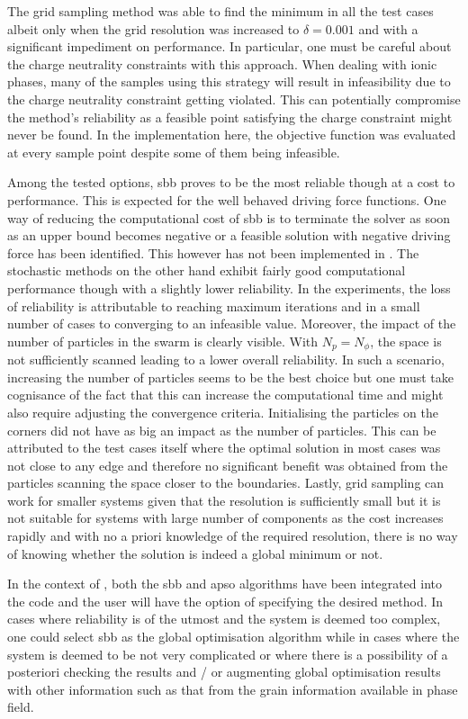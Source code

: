 The grid sampling method was able to find the minimum in all the test cases albeit only when the grid resolution was increased to $\delta = 0.001$ and with a significant impediment on performance. In particular, one must be careful about the charge neutrality constraints with this approach. When dealing with ionic phases, many of the samples using this strategy will result in infeasibility due to the charge neutrality constraint getting violated. This can potentially compromise the method's reliability as a feasible point satisfying the charge constraint might never be found. In the implementation here, the objective function was evaluated at every sample point despite some of them being infeasible.

Among the tested options, \gls{sbb} proves to be the most reliable though at a cost to performance. This is expected for the well behaved driving force functions. One way of reducing the computational cost of \gls{sbb} is to terminate the solver as soon as an upper bound becomes negative or a feasible solution with negative driving force has been identified. This however has not been implemented in {\GEM}. The stochastic methods on the other hand exhibit fairly good computational performance though with a slightly lower reliability. In the experiments, the loss of reliability is attributable to reaching maximum iterations and in a small number of cases to converging to an infeasible value. Moreover, the impact of the number of particles in the swarm is clearly visible. With $N_p = N_\phi$, the space is not sufficiently scanned leading to a lower overall reliability. In such a scenario, increasing the number of particles seems to be the best choice but one must take cognisance of the fact that this can increase the computational time and might also require adjusting the convergence criteria. Initialising the particles on the corners did not have as big an impact as the number of particles. This can be attributed to the test cases itself where the optimal solution in most cases was not close to any edge and therefore no significant benefit was obtained from the particles scanning the space closer to the boundaries. Lastly, grid sampling can work for smaller systems given that the resolution is sufficiently small but it is not suitable for systems with large number of components as the cost increases rapidly and with no a priori knowledge of the required resolution, there is no way of knowing whether the solution is indeed a global minimum or not.

In the context of {\YJ}, both the \gls{sbb} and \gls{apso} algorithms have been integrated into the code and the user will have the option of specifying the desired method. In cases where reliability is of the utmost and the system is deemed too complex, one could select \gls{sbb} as the global optimisation algorithm while in cases where the system is deemed to be not very complicated or where there is a possibility of a posteriori checking the results and / or augmenting global optimisation results with other information such as that from the grain information available in phase field.

